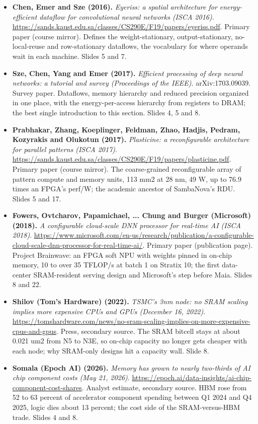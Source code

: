 \begin{itemize}[leftmargin=1.2em,itemsep=3pt]
\item \textbf{Chen, Emer and Sze (2016).} \textit{Eyeriss: a spatial architecture for energy-efficient dataflow for convolutional neural networks (ISCA 2016)}. \url{https://sands.kaust.edu.sa/classes/CS290E/F19/papers/eyeriss.pdf}. Primary paper (course mirror). Defines the weight-stationary, output-stationary, no-local-reuse and row-stationary dataflows, the vocabulary for where operands wait in each machine. Slides 5 and 7.
\item \textbf{Sze, Chen, Yang and Emer (2017).} \textit{Efficient processing of deep neural networks: a tutorial and survey (Proceedings of the IEEE)}. arXiv:1703.09039. Survey paper. Dataflows, memory hierarchy and reduced precision organized in one place, with the energy-per-access hierarchy from registers to DRAM; the best single introduction to this section. Slides 4, 5 and 8.
\item \textbf{Prabhakar, Zhang, Koeplinger, Feldman, Zhao, Hadjis, Pedram, Kozyrakis and Olukotun (2017).} \textit{Plasticine: a reconfigurable architecture for parallel patterns (ISCA 2017)}. \url{https://sands.kaust.edu.sa/classes/CS290E/F19/papers/plasticine.pdf}. Primary paper (course mirror). The coarse-grained reconfigurable array of pattern compute and memory units, 113 mm2 at 28 nm, 49 W, up to 76.9 times an FPGA's perf/W; the academic ancestor of SambaNova's RDU. Slides 5 and 17.
\item \textbf{Fowers, Ovtcharov, Papamichael, ... Chung and Burger (Microsoft) (2018).} \textit{A configurable cloud-scale DNN processor for real-time AI (ISCA 2018)}. \url{https://www.microsoft.com/en-us/research/publication/a-configurable-cloud-scale-dnn-processor-for-real-time-ai/}. Primary paper (publication page). Project Brainwave: an FPGA soft NPU with weights pinned in on-chip memory, 10 to over 35 TFLOP/s at batch 1 on Stratix 10; the first data-center SRAM-resident serving design and Microsoft's step before Maia. Slides 8 and 22.
\item \textbf{Shilov (Tom's Hardware) (2022).} \textit{TSMC's 3nm node: no SRAM scaling implies more expensive CPUs and GPUs (December 16, 2022)}. \url{https://tomshardware.com/news/no-sram-scaling-implies-on-more-expensive-cpus-and-gpus}. Press, secondary source. The SRAM bitcell stays at about 0.021 um2 from N5 to N3E, so on-chip capacity no longer gets cheaper with each node; why SRAM-only designs hit a capacity wall. Slide 8.
\item \textbf{Somala (Epoch AI) (2026).} \textit{Memory has grown to nearly two-thirds of AI chip component costs (May 21, 2026)}. \url{https://epoch.ai/data-insights/ai-chip-component-cost-shares}. Analyst estimate, secondary source. HBM rose from 52 to 63 percent of accelerator component spending between Q1 2024 and Q4 2025, logic dies about 13 percent; the cost side of the SRAM-versus-HBM trade. Slides 4 and 8.
\end{itemize}
